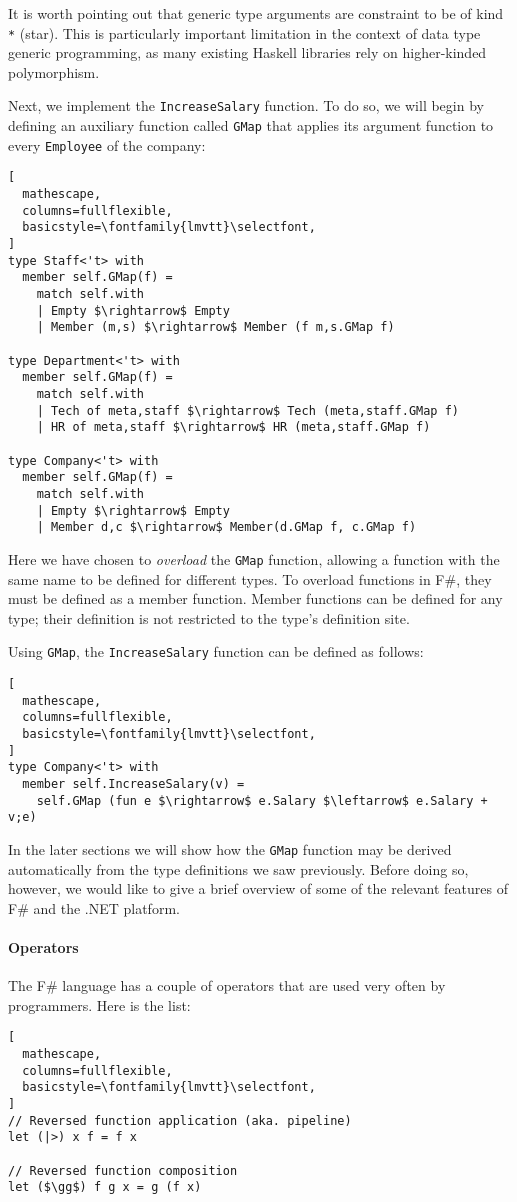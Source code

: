 \documentclass{sigplanconf}
\begin{document}
It is worth pointing out that generic type arguments are constraint to
be of kind \verb+*+ (star). This is particularly important limitation
in the context of data type generic programming, as many existing
Haskell libraries rely on higher-kinded polymorphism.

Next, we implement the \verb+IncreaseSalary+ function. To do so, we
will begin by defining an auxiliary function called \verb+GMap+ that
applies its argument function to every \verb+Employee+ of the company:

\begin{lstlisting}[
  mathescape,
  columns=fullflexible,
  basicstyle=\fontfamily{lmvtt}\selectfont,
]
type Staff<'t> with
  member self.GMap(f) = 
    match self.with
    | Empty $\rightarrow$ Empty
    | Member (m,s) $\rightarrow$ Member (f m,s.GMap f)

type Department<'t> with
  member self.GMap(f) =
    match self.with
    | Tech of meta,staff $\rightarrow$ Tech (meta,staff.GMap f)
    | HR of meta,staff $\rightarrow$ HR (meta,staff.GMap f)

type Company<'t> with
  member self.GMap(f) =
    match self.with
    | Empty $\rightarrow$ Empty
    | Member d,c $\rightarrow$ Member(d.GMap f, c.GMap f)
\end{lstlisting}
Here we have chosen to \emph{overload} the \verb+GMap+ function,
allowing a function with the same name to be defined for different
types. To overload functions in F\#, they must be defined as a member
function. Member functions can be defined for any type; their
definition is not restricted to the type's definition site. 

Using \verb+GMap+,  the \verb+IncreaseSalary+ function can be defined as follows:
\begin{lstlisting}[
  mathescape,
  columns=fullflexible,
  basicstyle=\fontfamily{lmvtt}\selectfont,
]
type Company<'t> with
  member self.IncreaseSalary(v) =
    self.GMap (fun e $\rightarrow$ e.Salary $\leftarrow$ e.Salary + v;e)
\end{lstlisting}

In the later sections we will show how the \verb+GMap+ function may be
derived automatically from the type definitions we saw
previously. Before doing so, however, we would like to give a brief
overview of some of the relevant features of F\# and the .NET
platform.

\paragraph{Operators} The F\# language has a couple of operators that
are used very often by programmers. Here is the list:
\begin{lstlisting}[
  mathescape,
  columns=fullflexible,
  basicstyle=\fontfamily{lmvtt}\selectfont,
]
// Reversed function application (aka. pipeline)
let (|>) x f = f x

// Reversed function composition
let ($\gg$) f g x = g (f x)
\end{lstlisting}
\end{document}
